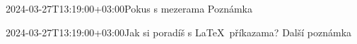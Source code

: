 \documentclass{article}
\begin{document}
\begin{note}{2024-03-27T13:19:00+03:00}{Pokus s mezerama}
  Poznámka
\end{note}

\begin{note}{2024-03-27T13:19:00+03:00}{Jak si poradíš s \LaTeX\ příkazama?}
  Další poznámka
\end{note}

\end{document}
